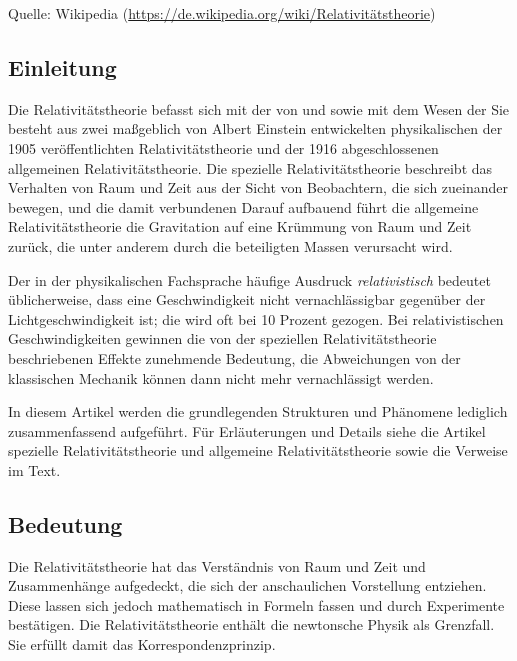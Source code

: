 Quelle: Wikipedia (\url{https://de.wikipedia.org/wiki/Relativitätstheorie})

\begin{nohyphens}

\subsection*{Einleitung}

Die Relativitätstheorie befasst sich mit der  von  und  sowie mit dem Wesen der  Sie besteht aus zwei maßgeblich von Albert Einstein entwickelten physikalischen  der 1905 veröffentlichten  Relativitätstheorie und der 1916 abgeschlossenen allgemeinen Relativitätstheorie. Die spezielle Relativitätstheorie beschreibt das Verhalten von Raum und Zeit aus der Sicht von Beobachtern, die sich  zueinander bewegen, und die damit verbundenen  Darauf aufbauend führt die allgemeine Relativitätstheorie die Gravitation auf eine Krümmung von Raum und Zeit zurück, die unter anderem durch die beteiligten Massen verursacht wird.

Der in der physikalischen Fachsprache häufige Ausdruck \textit{relativistisch} bedeutet üblicherweise, dass eine Geschwindigkeit nicht vernachlässigbar  gegenüber der Lichtgeschwindigkeit ist; die  wird oft bei 10 Prozent gezogen. Bei relativistischen Geschwindigkeiten gewinnen die von der speziellen Relativitätstheorie beschriebenen Effekte zunehmende Bedeutung, die Abweichungen von der klassischen Mechanik können dann nicht mehr vernachlässigt werden.

In diesem Artikel werden die grundlegenden Strukturen und Phänomene lediglich zusammenfassend aufgeführt. Für Erläuterungen und Details siehe die Artikel spezielle Relativitätstheorie und allgemeine Relativitätstheorie sowie die Verweise im Text.


\subsection*{Bedeutung}

Die Relativitätstheorie hat das Verständnis von Raum und Zeit  und Zusammenhänge aufgedeckt, die sich der anschaulichen Vorstellung entziehen. Diese lassen sich jedoch mathematisch  in Formeln fassen und durch Experimente bestätigen. Die Relativitätstheorie enthält die newtonsche Physik als Grenzfall. Sie erfüllt damit das Korrespondenzprinzip.


\end{nohyphens}
